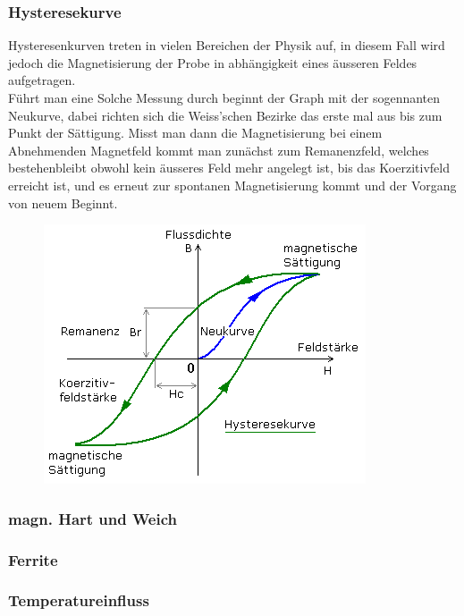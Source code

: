         \subsubsection*{Hysteresekurve}
            Hysteresenkurven treten in vielen Bereichen der Physik auf, in diesem Fall wird jedoch die Magnetisierung
            der Probe in abhängigkeit eines äusseren Feldes aufgetragen.\\
            Führt man eine Solche Messung durch beginnt der Graph mit der sogennanten Neukurve, dabei richten sich
            die Weiss'schen Bezirke das erste mal aus bis zum Punkt der Sättigung. Misst man dann die Magnetisierung bei einem Abnehmenden Magnetfeld
            kommt man zunächst zum Remanenzfeld, welches bestehenbleibt obwohl kein äusseres Feld mehr angelegt ist, bis 
            das Koerzitivfeld erreicht ist, und es erneut zur spontanen Magnetisierung kommt und der Vorgang von neuem Beginnt.
            \begin{figure}[H]
                \centering
                \includegraphics{Images/hyster.png}
            \end{figure}
        \subsubsection*{magn. Hart und Weich}

        \subsubsection*{Ferrite}

        \subsubsection*{Temperatureinfluss}

